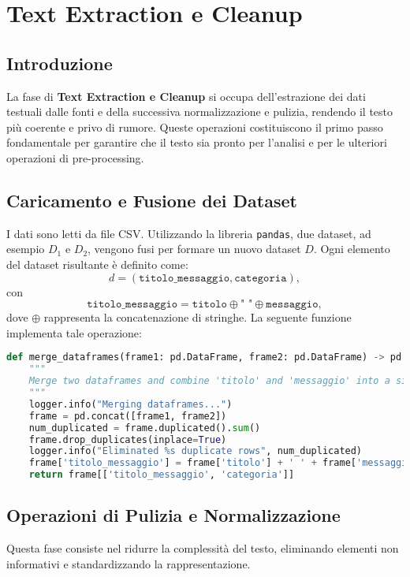 \chapter{Text Extraction e Cleanup}

\section{Introduzione}
La fase di \textbf{Text Extraction e Cleanup} si occupa dell'estrazione dei dati testuali dalle fonti e della successiva normalizzazione e pulizia, rendendo il testo più coerente e privo di rumore. Queste operazioni costituiscono il primo passo fondamentale per garantire che il testo sia pronto per l'analisi e per le ulteriori operazioni di pre-processing.

\section{Caricamento e Fusione dei Dataset}
I dati sono letti da file CSV. Utilizzando la libreria \texttt{pandas}, due dataset, ad esempio $D_1$ e $D_2$, vengono fusi per formare un nuovo dataset $D$. Ogni elemento del dataset risultante è definito come:
\[
d = (\texttt{titolo\_messaggio}, \texttt{categoria}),
\]
con
\[
\texttt{titolo\_messaggio} = \texttt{titolo} \oplus \texttt{" "} \oplus \texttt{messaggio},
\]
dove $\oplus$ rappresenta la concatenazione di stringhe. La seguente funzione implementa tale operazione:

\begin{lstlisting}[language=Python,caption={Funzione per la fusione dei DataFrame}]
def merge_dataframes(frame1: pd.DataFrame, frame2: pd.DataFrame) -> pd.DataFrame:
    """
    Merge two dataframes and combine 'titolo' and 'messaggio' into a single column.
    """
    logger.info("Merging dataframes...")
    frame = pd.concat([frame1, frame2])
    num_duplicated = frame.duplicated().sum()
    frame.drop_duplicates(inplace=True)
    logger.info("Eliminated %s duplicate rows", num_duplicated)
    frame['titolo_messaggio'] = frame['titolo'] + ' ' + frame['messaggio']
    return frame[['titolo_messaggio', 'categoria']]
\end{lstlisting}

\section{Operazioni di Pulizia e Normalizzazione}
Questa fase consiste nel ridurre la complessità del testo, eliminando elementi non informativi e standardizzando la rappresentazione.

